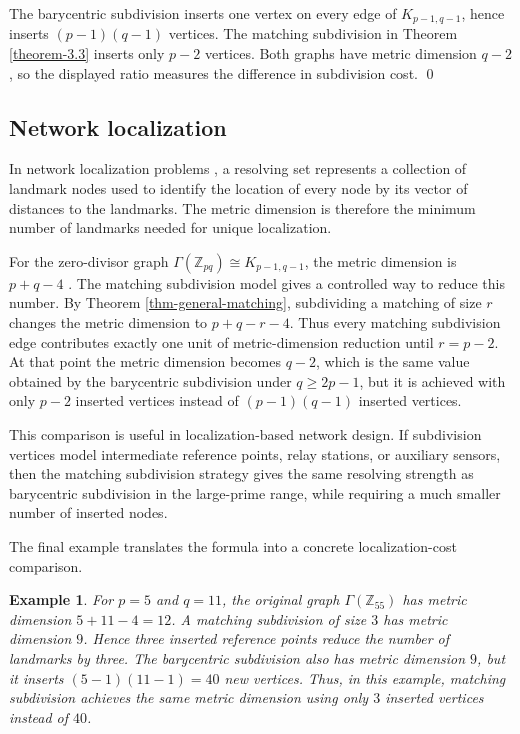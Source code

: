 \documentclass[12pt]{article}
\renewenvironment{proof}{{\bf \noindent Proof.}}{\qed}
\newtheorem{example}[theorem]{Example}
\begin{document}
\begin{proof}
The barycentric subdivision inserts one vertex on every edge of $K_{p-1,q-1}$, hence inserts $(p-1)(q-1)$ vertices. The matching subdivision in Theorem \ref{theorem-3.3} inserts only $p-2$ vertices. Both graphs have metric dimension $q-2$, so the displayed ratio measures the difference in subdivision cost.
\end{proof}

\subsection{Network localization}

In network localization problems \cite{kh}, a resolving set represents a collection of landmark nodes used to identify the location of every node by its vector of distances to the landmarks. The metric dimension is therefore the minimum number of landmarks needed for unique localization.

For the zero-divisor graph $\Gamma(\mathbb Z_{pq})\cong K_{p-1,q-1}$, the metric dimension is $p+q-4$ \cite{chart}. The matching subdivision model gives a controlled way to reduce this number. By Theorem \ref{thm-general-matching}, subdividing a matching of size $r$ changes the metric dimension to $p+q-r-4$. Thus every matching subdivision edge contributes exactly one unit of metric-dimension reduction until $r=p-2$. At that point the metric dimension becomes $q-2$, which is the same value obtained by the barycentric subdivision under $q\geq 2p-1$, but it is achieved with only $p-2$ inserted vertices instead of $(p-1)(q-1)$ inserted vertices.

This comparison is useful in localization-based network design. If subdivision vertices model intermediate reference points, relay stations, or auxiliary sensors, then the matching subdivision strategy gives the same resolving strength as barycentric subdivision in the large-prime range, while requiring a much smaller number of inserted nodes.

\noindent The final example translates the formula into a concrete localization-cost comparison.
\begin{example}\label{ex-localization-cost}
For $p=5$ and $q=11$, the original graph $\Gamma(\mathbb Z_{55})$ has metric dimension $5+11-4=12$. A matching subdivision of size $3$ has metric dimension $9$. Hence three inserted reference points reduce the number of landmarks by three. The barycentric subdivision also has metric dimension $9$, but it inserts $(5-1)(11-1)=40$ new vertices. Thus, in this example, matching subdivision achieves the same metric dimension using only $3$ inserted vertices instead of $40$.
\end{example}
\end{document}
